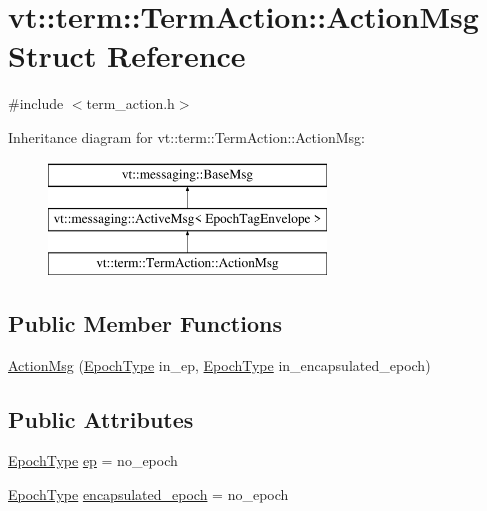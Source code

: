\hypertarget{structvt_1_1term_1_1_term_action_1_1_action_msg}{}\section{vt\+:\+:term\+:\+:Term\+Action\+:\+:Action\+Msg Struct Reference}
\label{structvt_1_1term_1_1_term_action_1_1_action_msg}


{\ttfamily \#include $<$term\+\_\+action.\+h$>$}

Inheritance diagram for vt\+:\+:term\+:\+:Term\+Action\+:\+:Action\+Msg\+:\begin{figure}[H]
\begin{center}
\leavevmode
\includegraphics[height=3.000000cm]{structvt_1_1term_1_1_term_action_1_1_action_msg}
\end{center}
\end{figure}
\subsection*{Public Member Functions}
\begin{DoxyCompactItemize}
\item 
\hyperlink{structvt_1_1term_1_1_term_action_1_1_action_msg_af6b21910f9a4376c20b5e475deecc2cd}{Action\+Msg} (\hyperlink{namespacevt_a81d11b28122d43bf9834577e4a06440f}{Epoch\+Type} in\+\_\+ep, \hyperlink{namespacevt_a81d11b28122d43bf9834577e4a06440f}{Epoch\+Type} in\+\_\+encapsulated\+\_\+epoch)
\end{DoxyCompactItemize}
\subsection*{Public Attributes}
\begin{DoxyCompactItemize}
\item 
\hyperlink{namespacevt_a81d11b28122d43bf9834577e4a06440f}{Epoch\+Type} \hyperlink{structvt_1_1term_1_1_term_action_1_1_action_msg_ae3b7b713b48328dfaaa98d54a329b1b4}{ep} = no\+\_\+epoch
\item 
\hyperlink{namespacevt_a81d11b28122d43bf9834577e4a06440f}{Epoch\+Type} \hyperlink{structvt_1_1term_1_1_term_action_1_1_action_msg_a38713a73a2872552ac0f129bc575c963}{encapsulated\+\_\+epoch} = no\+\_\+epoch
\end{DoxyCompactItemize}
